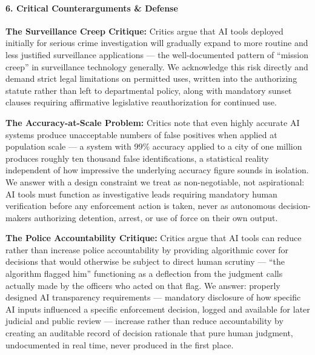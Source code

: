 \paragraph{6. Critical Counterarguments \&
Defense}\label{critical-counterarguments-defense-26}

\textbf{The Surveillance Creep Critique:} Critics argue that AI tools
deployed initially for serious crime investigation will gradually expand
to more routine and less justified surveillance applications --- the
well-documented pattern of ``mission creep'' in surveillance technology
generally. We acknowledge this risk directly and demand strict legal
limitations on permitted uses, written into the authorizing statute
rather than left to departmental policy, along with mandatory sunset
clauses requiring affirmative legislative reauthorization for continued
use.

\textbf{The Accuracy-at-Scale Problem:} Critics note that even highly
accurate AI systems produce unacceptable numbers of false positives when
applied at population scale --- a system with 99\% accuracy applied to a
city of one million produces roughly ten thousand false identifications,
a statistical reality independent of how impressive the underlying
accuracy figure sounds in isolation. We answer with a design constraint
we treat as non-negotiable, not aspirational: AI tools must function as
investigative leads requiring mandatory human verification before any
enforcement action is taken, never as autonomous decision-makers
authorizing detention, arrest, or use of force on their own output.

\textbf{The Police Accountability Critique:} Critics argue that AI tools
can reduce rather than increase police accountability by providing
algorithmic cover for decisions that would otherwise be subject to
direct human scrutiny --- ``the algorithm flagged him'' functioning as a
deflection from the judgment calls actually made by the officers who
acted on that flag. We answer: properly designed AI transparency
requirements --- mandatory disclosure of how specific AI inputs
influenced a specific enforcement decision, logged and available for
later judicial and public review --- increase rather than reduce
accountability by creating an auditable record of decision rationale
that pure human judgment, undocumented in real time, never produced in
the first place.

